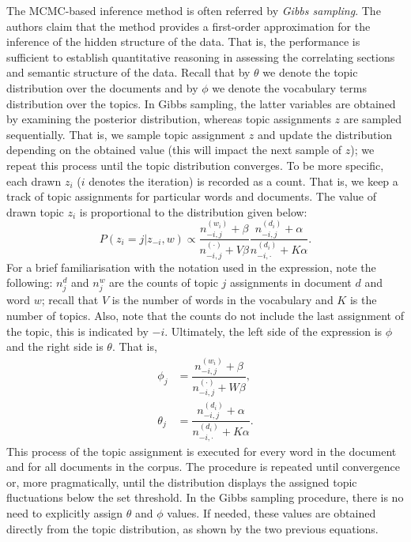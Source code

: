 \documentclass{mprop}
\begin{document}
\par The MCMC-based inference method is often referred by \textit{Gibbs sampling}. The authors claim that the method provides a first-order approximation for the inference of the hidden structure of the data. That is, the performance is sufficient to establish quantitative reasoning in assessing the correlating sections and semantic structure of the data. Recall that by $\theta$ we denote the topic distribution over the documents and by $\phi$ we denote the vocabulary terms distribution over the topics. In Gibbs sampling, the latter variables are obtained by examining the posterior distribution, whereas topic assignments $z$ are sampled sequentially. That is, we sample topic assignment $z$ and update the distribution depending on the obtained value (this will impact the next sample of $z$); we repeat this process until the topic distribution converges. To be more specific, each drawn $z_i$ ($i$ denotes the iteration) is recorded as a count. That is, we keep a track of topic assignments for particular words and documents. The value of drawn topic $z_i$ is proportional to the distribution given below:
\begin{equation}
P(z_i = j | z_{-i}, w) \propto \dfrac{n_{-i, j}^{(w_i)} + \beta}{n_{-i, j}^{(\cdot)} + V\beta}\dfrac{n_{-i, j}^{(d_i)} + \alpha}{n_{-i, \cdot}^{(d_i)} + K\alpha}.
\end{equation}
For a brief familiarisation with the notation used in the expression, note the following: $n_j^{d}$ and $n_j^{w}$ are the counts of topic $j$ assignments in document $d$ and word $w$; recall that $V$ is the number of words in the vocabulary and $K$ is the number of topics. Also, note that the counts do not include the last assignment of the topic, this is indicated by $-i$. Ultimately, the left side of the expression is $\phi$ and the right side is $\theta$. That is, 
\begin{align}
\phi_j &= \dfrac{n_{-i, j}^{(w_i)} + \beta}{n_{-i, j}^{(\cdot)} + W\beta},\\
\theta_j &= \dfrac{n_{-i, j}^{(d_i)} + \alpha}{n_{-i, \cdot}^{(d_i)} + K\alpha}.
\end{align}
This process of the topic assignment is executed for every word in the document and for all documents in the corpus. The procedure is repeated until convergence or, more pragmatically, until the distribution displays the assigned topic fluctuations below the set threshold. In the Gibbs sampling procedure, there is no need to explicitly assign $\theta$ and $\phi$ values. If needed, these values are obtained directly from the topic distribution, as shown by the two previous equations.
\end{document}
